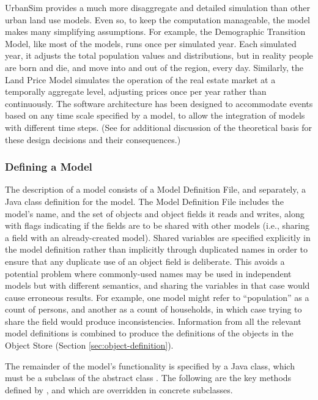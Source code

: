 UrbanSim provides a much more disaggregate and detailed simulation
than other urban land use models.  Even so, to keep the
computation manageable, the model makes many simplifying
assumptions.  For example, the Demographic Transition Model, like
most of the models, runs once per simulated year. Each simulated
year, it adjusts the total population values and distributions,
but in reality people are born and die, and move into and out of
the region, every day.  Similarly, the Land Price Model simulates
the operation of the real estate market at a temporally aggregate
level, adjusting prices once per year rather than continuously.
The software architecture has been designed to accommodate events
based on any time scale specified by a model, to allow the
integration of models with different time steps. (See
\citep{urbansim-reference-2000,waddell-queensland-2000} for
additional discussion of the theoretical basis for these design
decisions and their consequences.)

\subsubsection{Defining a Model}
\label{sec:defining-models}

The description of a model consists of a Model Definition File, and
separately, a Java class definition for the model.  The Model Definition
File includes the model's name, and the set of objects and object fields it
reads and writes, along with flags indicating if the fields are to be
shared with other models (i.e., sharing a field with an already-created
model).  Shared variables are specified explicitly in the model definition
rather than implicitly through duplicated names in order to ensure that any
duplicate use of an object field is deliberate.  This avoids a potential
problem where commonly-used names may be used in independent models but
with different semantics, and sharing the variables in that case would
cause erroneous results.  For example, one model might refer to
``population'' as a count of persons, and another as a count of households,
in which case trying to share the field would produce inconsistencies.
Information from all the relevant model definitions is combined to produce
the definitions of the objects in the Object Store (Section
\ref{sec:object-definition}).

The remainder of the model's functionality is specified by a Java class,
which must be a subclass of the abstract class .  The
following are the key methods defined by , and which are
overridden in concrete subclasses.

